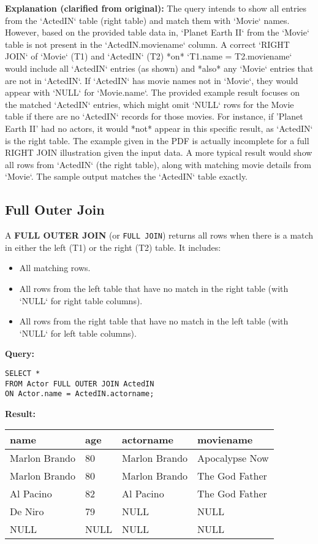 \documentclass{article}
\begin{document}
\textbf{Explanation (clarified from original):} The query intends to show all entries from the `ActedIN` table (right table) and match them with `Movie` names. However, based on the provided table data in, `Planet Earth II` from the `Movie` table is not present in the `ActedIN.moviename` column. A correct `RIGHT JOIN` of `Movie` (T1) and `ActedIN` (T2) *on* `T1.name = T2.moviename` would include all `ActedIN` entries (as shown) and *also* any `Movie` entries that are not in `ActedIN`. If `ActedIN` has movie names not in `Movie`, they would appear with `NULL` for `Movie.name`. The provided example result focuses on the matched `ActedIN` entries, which might omit `NULL` rows for the Movie table if there are no `ActedIN` records for those movies. For instance, if 'Planet Earth II' had no actors, it would *not* appear in this specific result, as `ActedIN` is the right table. The example given in the PDF is actually incomplete for a full RIGHT JOIN illustration given the input data. A more typical result would show all rows from `ActedIN` (the right table), along with matching movie details from `Movie`. The sample output matches the `ActedIN` table exactly.

\subsection*{Full Outer Join}
A \textbf{FULL OUTER JOIN} (or \texttt{FULL JOIN}) returns all rows when there is a match in either the left (T1) or the right (T2) table. It includes:
\begin{itemize}
    \item All matching rows.
    \item All rows from the left table that have no match in the right table (with `NULL` for right table columns).
    \item All rows from the right table that have no match in the left table (with `NULL` for left table columns).
\end{itemize}

\textbf{Query:} 
\begin{lstlisting}
SELECT *
FROM Actor FULL OUTER JOIN ActedIN
ON Actor.name = ActedIN.actorname;
\end{lstlisting}

\textbf{Result:} 
\begin{tabular}{|l|l|l|l|}
    \hline
    \textbf{name} & \textbf{age} & \textbf{actorname} & \textbf{moviename} \\
    \hline
    Marlon Brando & 80 & Marlon Brando & Apocalypse Now \\
    Marlon Brando & 80 & Marlon Brando & The God Father \\
    Al Pacino & 82 & Al Pacino & The God Father \\
    De Niro & 79 & NULL & NULL \\
    NULL & NULL & NULL & NULL \\ %
    \hline
\end{tabular}
\end{document}

